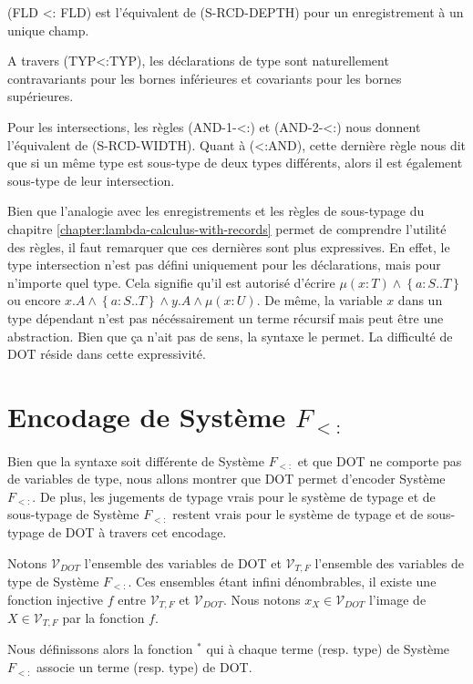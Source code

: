 (FLD <: FLD) est l'équivalent de (S-RCD-DEPTH) pour un enregistrement à un
unique champ.

A travers (TYP<:TYP), les déclarations de type sont naturellement contravariants
pour les bornes inférieures et covariants pour les bornes supérieures.

Pour les intersections, les règles (AND-1-<:) et (AND-2-<:) nous donnent
l'équivalent de (S-RCD-WIDTH). Quant à (<:AND), cette dernière règle nous dit
que si un même type est sous-type de deux types différents, alors il est
également sous-type de leur intersection.

Bien que l'analogie avec les enregistrements et les règles de sous-typage du
chapitre \ref{chapter:lambda-calculus-with-records} permet de comprendre
l'utilité des règles, il faut remarquer que ces dernières sont plus expressives. En
effet, le type intersection n'est pas défini uniquement pour les déclarations,
mais pour n'importe quel type. Cela signifie qu'il est autorisé d'écrire $\mu(x
: T) \wedge \left\{ a : S .. T \right\}$ ou encore $x.A \wedge \left\{ a : S ..
  T \right\} \wedge y.A \wedge \mu(x : U)$.
De même, la variable $x$ dans un type dépendant n'est pas nécéssairement un
terme récursif mais peut être une abstraction. Bien que ça n'ait pas de sens, la
syntaxe le permet.
La difficulté de DOT réside dans cette expressivité.

\section{Encodage de Système $F_{<:}$}

Bien que la syntaxe soit différente de Système $F_{<:}$ et que DOT ne comporte
pas de variables de type, nous allons montrer que DOT permet d'encoder Système
$F_{<:}$. De plus, les jugements de typage vrais pour le système de typage et de
sous-typage de Système $F_{<:}$ restent vrais pour le système de typage et de
sous-typage de DOT à travers cet encodage.

Notons $\mathcal{V}_{DOT}$ l'ensemble des variables de DOT et $\mathcal{V}_{T,
  F}$ l'ensemble des variables de type de Système $F_{<:}$. Ces ensembles 
étant infini dénombrables, il existe une fonction injective $f$ entre
$\mathcal{V}_{T, F}$ et $\mathcal{V}_{DOT}$. Nous notons $x_{X} \in
\mathcal{V}_{DOT}$ l'image de $X \in \mathcal{V}_{T, F}$ par la fonction $f$.

Nous définissons alors la fonction ${}^{*}$ qui à chaque terme (resp. type) de
Système $F_{<:}$ associe un terme (resp. type) de DOT.


